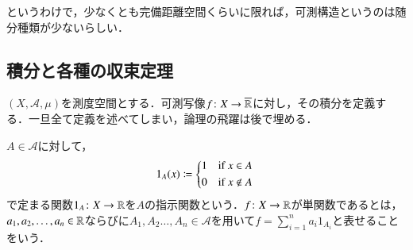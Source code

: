 というわけで，少なくとも完備距離空間くらいに限れば，可測構造というのは随分種類が少ないらしい．

\subsection{積分と各種の収束定理}

$(X,\mathcal{A},\mu)$を測度空間とする．可測写像$f \colon X \to \overline{\mathbb{R}}$に対し，その積分を定義する．一旦全て定義を述べてしまい，論理の飛躍は後で埋める．

\begin{defi}
$A \in \mathcal{A}$に対して，
\begin{equation}
1_A(x) \coloneqq \begin{dcases*}
    1 & if $x \in A$ \\
    0 & if $x \notin A$
  \end{dcases*}
\end{equation}で定まる関数$1_A \colon X \to \mathbb{R}$を$A$の指示関数という．$f \colon X \to \mathbb{R}$が単関数であるとは，$a_1, a_2, \dots, a_n \in \mathbb{R}$ならびに$A_1, A_2 \dots, A_n \in \mathcal{A}$を用いて$f = \sum_{i=1}^n a_i 1_{A_i}$と表せることをいう．
\end{defi}

